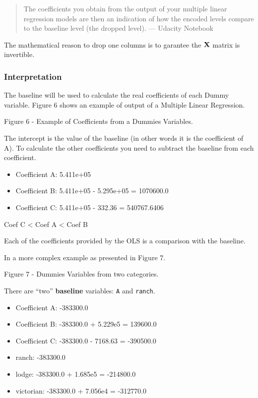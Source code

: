 \documentclass[]{book}
\providecommand{\tightlist}{%
  \setlength{\itemsep}{0pt}\setlength{\parskip}{0pt}}
\begin{document}
\begin{quote}
The coefficients you obtain from the output of your multiple linear
regression models are then an indication of how the encoded levels
compare to the baseline level (the dropped level). --- Udacity Notebook
\end{quote}

The mathematical reason to drop one columns is to garantee the
\(\bold X\) matrix is invertible.

\subsubsection*{Interpretation}\label{interpretation-1}

The baseline will be used to calculate the real coefficients of each
Dummy variable. Figure 6 shows an example of output of a Multiple Linear
Regression.

Figure 6 - Example of Coefficients from a Dummies Variables.

The intercept is the value of the baseline (in other words it is the
coefficient of A). To calculate the other coefficients you need to
subtract the baseline from each coefficient.

\begin{itemize}
\tightlist
\item
  Coefficient A: 5.411e+05
\item
  Coefficient B: 5.411e+05 - 5.295e+05 = 1070600.0
\item
  Coefficient C: 5.411e+05 - 332.36 = 540767.6406
\end{itemize}

Coef C \textless{} Coef A \textless{} Coef B

Each of the coefficients provided by the OLS is a comparison with the
baseline.

In a more complex example as presented in Figure 7.

Figure 7 - Dummies Variables from two categories.

There are ``two'' \textbf{baseline} variables: \texttt{A} and
\texttt{ranch}.

\begin{itemize}
\tightlist
\item
  Coefficient A: -383300.0
\item
  Coefficient B: -383300.0 + 5.229e5 = 139600.0
\item
  Coefficient C: -383300.0 - 7168.63 = -390500.0
\item
  ranch: -383300.0
\item
  lodge: -383300.0 + 1.685e5 = -214800.0
\item
  victorian: -383300.0 + 7.056e4 = -312770.0
\end{itemize}
\end{document}
